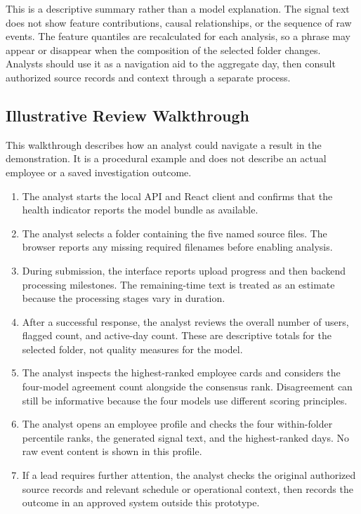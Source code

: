 This is a descriptive summary rather than a model explanation. The
signal text does not show feature contributions, causal relationships,
or the sequence of raw events. The feature quantiles are recalculated
for each analysis, so a phrase may appear or disappear when the
composition of the selected folder changes. Analysts should use it as
a navigation aid to the aggregate day, then consult authorized source
records and context through a separate process.

\subsection{Illustrative Review Walkthrough}
This walkthrough describes how an analyst could navigate a result in
the demonstration. It is a procedural example and does not describe an
actual employee or a saved investigation outcome.

\begin{enumerate}
  \item The analyst starts the local API and React client and confirms
        that the health indicator reports the model bundle as available.
  \item The analyst selects a folder containing the five named source
        files. The browser reports any missing required filenames
        before enabling analysis.
  \item During submission, the interface reports upload progress and
        then backend processing milestones. The remaining-time text is
        treated as an estimate because the processing stages vary in
        duration.
  \item After a successful response, the analyst reviews the overall
        number of users, flagged count, and active-day count. These are
        descriptive totals for the selected folder, not quality
        measures for the model.
  \item The analyst inspects the highest-ranked employee cards and
        considers the four-model agreement count alongside the consensus
        rank. Disagreement can still be informative because the four
        models use different scoring principles.
  \item The analyst opens an employee profile and checks the four
        within-folder percentile ranks, the generated signal text, and
        the highest-ranked days. No raw event content is shown in this
        profile.
  \item If a lead requires further attention, the analyst checks the
        original authorized source records and relevant schedule or
        operational context, then records the outcome in an approved
        system outside this prototype.
\end{enumerate}


